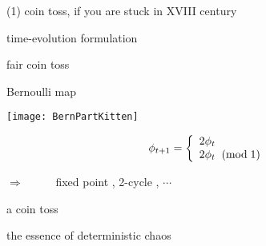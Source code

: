 \begin{frame}{(1)  coin toss, if you are stuck in XVIII century}
\vfill
    \begin{center}
{\huge time-evolution formulation}
    \end{center}
\vfill
\end{frame} %

\begin{frame}{fair coin toss} %
\renewcommand{\ssp}{\ensuremath{\phi}}             %
    \begin{block}{{Bernoulli}  map} %
\begin{center}
            \begin{minipage}[c]{0.36\textwidth}\begin{center}
\texttt{[image: BernPartKitten]}
            \end{center}\end{minipage}
            \hspace{2ex}
            \begin{minipage}[c]{0.46\textwidth}\begin{center}
\[
\ssp_{\zeit+1} =
\left\{ \begin{array}{l} %
        2 \ssp_{\zeit}
                             \\%
        2 \ssp_{\zeit} \;\; (\mbox{mod}\;1)
         \end{array}\right.
\]
            \end{center}\end{minipage}
\end{center}

\hfill $\Rightarrow$~~~~~
fixed point , 2-cycle , $\cdots$
    \end{block}

\bigskip

a 
{coin toss}

\hfill the essence of {\color{blue}deterministic chaos}
\end{frame} %

